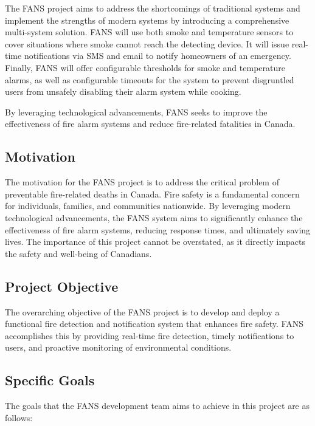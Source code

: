 The FANS project aims to address the shortcomings of traditional systems and implement the strengths of modern systems
by introducing a comprehensive multi-system solution. FANS will use both smoke and temperature sensors to cover
situations where smoke cannot reach the detecting device. It will issue real-time notifications via SMS and email to
notify homeowners of an emergency. Finally, FANS will offer configurable thresholds for smoke and temperature alarms, as
well as configurable timeouts for the system to prevent disgruntled users from unsafely disabling their alarm system
while cooking.

By leveraging technological advancements, FANS seeks to improve the effectiveness of fire alarm systems and reduce
fire-related fatalities in Canada.

\subsection{Motivation}

The motivation for the FANS project is to address the critical problem of preventable fire-related deaths in Canada.
Fire safety is a fundamental concern for individuals, families, and communities nationwide. By leveraging modern
technological advancements, the FANS system aims to significantly enhance the effectiveness of fire alarm systems,
reducing response times, and ultimately saving lives. The importance of this project cannot be overstated, as it
directly impacts the safety and well-being of Canadians.

\subsection{Project Objective}

The overarching objective of the FANS project is to develop and deploy a functional fire detection and notification
system that enhances fire safety. FANS accomplishes this by providing real-time fire detection, timely notifications to
users, and proactive monitoring of environmental conditions.

\subsection{Specific Goals}

The goals that the FANS development team aims to achieve in this project are as follows:

